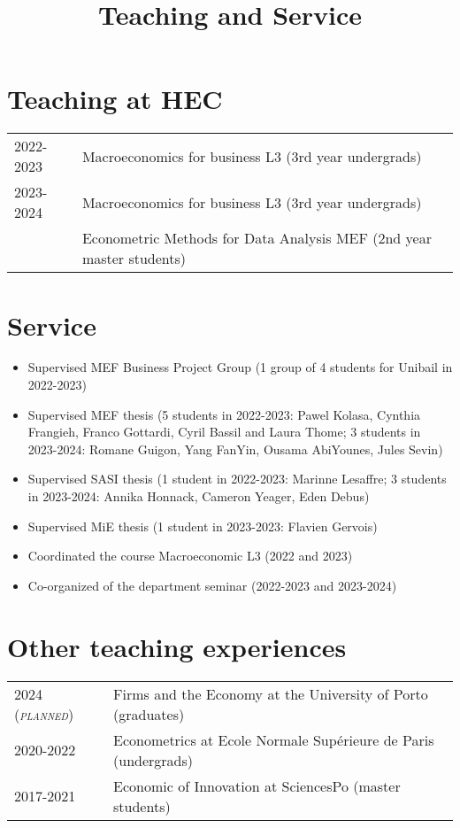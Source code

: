 \documentclass[12pt]{article}
\begin{document}
\title{\textbf{Teaching and Service}}
\date{}
\maketitle

\section*{Teaching at HEC}

\begin{tabular}{p{4cm}l}
\textsc{2022-2023} & Macroeconomics for business L3 (3rd year undergrads) \\
\textsc{2023-2024} &  Macroeconomics for business L3 (3rd year undergrads) \\
& Econometric Methods for Data Analysis MEF (2nd year master students)\\
\end{tabular}

\section*{Service}
\begin{itemize}
    \item Supervised MEF Business Project Group (1 group of 4 students for Unibail in 2022-2023)
    \item Supervised MEF thesis (5 students in 2022-2023: Pawel Kolasa, Cynthia Frangieh, Franco Gottardi, Cyril Bassil and Laura Thome; 3 students in 2023-2024: Romane Guigon, Yang FanYin, Ousama AbiYounes, Jules Sevin)
    \item Supervised SASI thesis (1 student in 2022-2023: Marinne Lesaffre; 3 students in 2023-2024: Annika Honnack, Cameron Yeager, Eden Debus)
    \item Supervised MiE thesis (1 student in 2023-2023: Flavien Gervois)
    \item Coordinated the course Macroeconomic L3 (2022 and 2023)
    \item Co-organized of the department seminar (2022-2023 and 2023-2024)
\end{itemize}

\section*{Other teaching experiences}
\begin{tabular}{p{4cm}p{12 cm}}
\textsc{2024 (\emph{planned})} & Firms and the Economy  at the University of Porto (graduates) \\
\textsc{2020-2022} & Econometrics at Ecole Normale Supérieure de Paris (undergrads) \\
\textsc{2017-2021} & Economic of Innovation at SciencesPo (master students) \\
\end{tabular}
\end{document}
